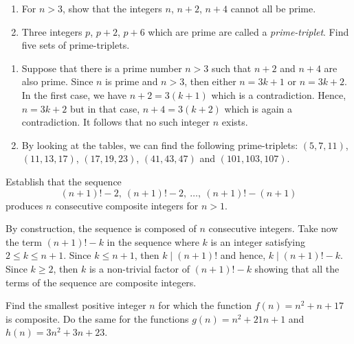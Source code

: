 \begin{exercise}
    \begin{enumerate}
        \item For $n > 3$, show that the integers $n$, $n+2$, $n+4$ cannot all be prime.
        \item Three integers $p$, $p+2$, $p+6$ which are prime are called a \textit{prime-triplet}. Find five sets of prime-triplets.
    \end{enumerate}
\end{exercise}

\begin{solution}
    \begin{enumerate}
        \item Suppose that there is a prime number $n > 3$ such that $n + 2$ and $n+4$ are also prime. Since $n$ is prime and $n > 3$, then either $n = 3k+1$ or $n = 3k+2$. In the first case, we have $n + 2 = 3(k+1)$ which is a contradiction. Hence, $n = 3k+2$ but in that case, $n+4 = 3(k+2)$ which is again a contradiction. It follows that no such integer $n$ exists.
        \item By looking at the tables, we can find the following prime-triplets: $(5, 7, 11)$, $(11, 13, 17)$, $(17, 19, 23)$, $(41, 43, 47)$ and $(101, 103, 107)$.
    \end{enumerate}
\end{solution}

\begin{exercise}
    Establish that the sequence
    $$(n+1)!-2, \ (n+1)!-2, \ \dots, \ (n+1)!-(n+1)$$
    produces $n$ consecutive composite integers for $n > 1$. \\
\end{exercise}

\begin{solution}
    By construction, the sequence is composed of $n$ consecutive integers. Take now the term $(n+1)! - k$ in the sequence where $k$ is an integer satisfying $2 \leq k \leq n+1$. Since $k \leq n+1$, then $k \mid (n+1)!$ and hence, $k\mid (n+1)! - k$. Since $k \geq 2$, then $k$ is a non-trivial factor of $(n+1)! - k$ showing that all the terms of the sequence are composite integers.\\ 
\end{solution}

\begin{exercise}
    Find the smallest positive integer $n$ for which the function $f(n) = n^2 + n + 17$ is composite. Do the same for the functions $g(n) = n^2 + 21n + 1$ and $h(n) = 3n^2 + 3n + 23$. \\
\end{exercise}

